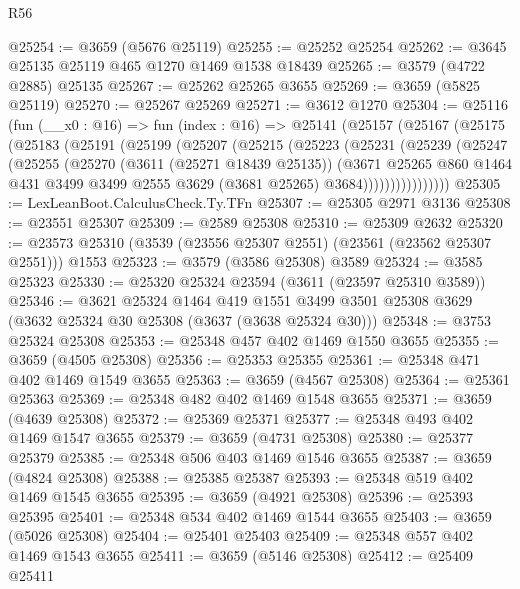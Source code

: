 \begin{lexlean}{R56}
\begin{coremodule}
@25254 := @3659 (@5676 @25119)
@25255 := @25252 @25254
@25262 := @3645 @25135 @25119 @465 @1270 @1469 @1538 @18439
@25265 := @3579 (@4722 @2885) @25135
@25267 := @25262 @25265 @3655
@25269 := @3659 (@5825 @25119)
@25270 := @25267 @25269
@25271 := @3612 @1270
@25304 := @25116
    (fun (__x0 : @16) =>
    fun (index : @16) =>
    @25141
      (@25157
        (@25167
          (@25175
            (@25183
              (@25191
                (@25199
                  (@25207
                    (@25215
                      (@25223
                        (@25231
                          (@25239
                            (@25247
                              (@25255
                                (@25270
                                  (@3611 (@25271 @18439 @25135))
                                  (@3671
                                    @25265
                                    @860
                                    @1464
                                    @431
                                    @3499
                                    @3499
                                    @2555
                                    @3629
                                    (@3681 @25265)
                                    @3684))))))))))))))))
@25305 := LexLeanBoot.CalculusCheck.Ty.TFn
@25307 := @25305 @2971 @3136
@25308 := @23551 @25307
@25309 := @2589 @25308
@25310 := @25309 @2632
@25320 := @23573 @25310 (@3539 (@23556 @25307 @2551) (@23561 (@23562 @25307 @2551))) @1553
@25323 := @3579 (@3586 @25308) @3589
@25324 := @3585 @25323
@25330 := @25320 @25324 @23594 (@3611 (@23597 @25310 @3589))
@25346 := @3621
    @25324
    @1464
    @419
    @1551
    @3499
    @3501
    @25308
    @3629
    (@3632 @25324 @30 @25308 (@3637 (@3638 @25324 @30)))
@25348 := @3753 @25324 @25308
@25353 := @25348 @457 @402 @1469 @1550 @3655
@25355 := @3659 (@4505 @25308)
@25356 := @25353 @25355
@25361 := @25348 @471 @402 @1469 @1549 @3655
@25363 := @3659 (@4567 @25308)
@25364 := @25361 @25363
@25369 := @25348 @482 @402 @1469 @1548 @3655
@25371 := @3659 (@4639 @25308)
@25372 := @25369 @25371
@25377 := @25348 @493 @402 @1469 @1547 @3655
@25379 := @3659 (@4731 @25308)
@25380 := @25377 @25379
@25385 := @25348 @506 @403 @1469 @1546 @3655
@25387 := @3659 (@4824 @25308)
@25388 := @25385 @25387
@25393 := @25348 @519 @402 @1469 @1545 @3655
@25395 := @3659 (@4921 @25308)
@25396 := @25393 @25395
@25401 := @25348 @534 @402 @1469 @1544 @3655
@25403 := @3659 (@5026 @25308)
@25404 := @25401 @25403
@25409 := @25348 @557 @402 @1469 @1543 @3655
@25411 := @3659 (@5146 @25308)
@25412 := @25409 @25411

\end{coremodule}
\end{lexlean}
